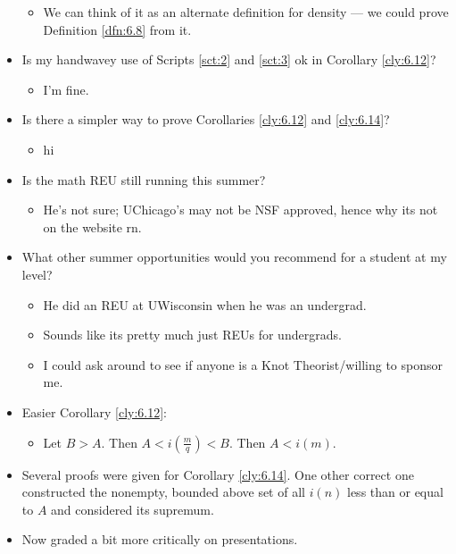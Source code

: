 \documentclass{report}
\begin{document}
\begin{itemize}
    \begin{itemize}
        \item We can think of it as an alternate definition for density --- we could prove Definition \ref{dfn:6.8} from it.
    \end{itemize}
    \item Is my handwavey use of Scripts \ref{sct:2} and \ref{sct:3} ok in Corollary \ref{cly:6.12}?
    \begin{itemize}
        \item I'm fine.
    \end{itemize}
    \item Is there a simpler way to prove Corollaries \ref{cly:6.12} and \ref{cly:6.14}?
    \begin{itemize}
        \item hi
    \end{itemize}
    \item Is the math REU still running this summer?
    \begin{itemize}
        \item He's not sure; UChicago's may not be NSF approved, hence why its not on the website rn.
    \end{itemize}
    \item What other summer opportunities would you recommend for a student at my level?
    \begin{itemize}
        \item He did an REU at UWisconsin when he was an undergrad.
        \item Sounds like its pretty much just REUs for undergrads.
        \item I could ask around to see if anyone is a Knot Theorist/willing to sponsor me.
    \end{itemize}
    \item {}Easier Corollary \ref{cly:6.12}:
    \begin{itemize}
        \item Let $B>A$. Then $A<i(\frac{m}{q})<B$. Then $A<i(m)$.
    \end{itemize}
    \item Several proofs were given for Corollary \ref{cly:6.14}. One other correct one constructed the nonempty, bounded above set of all $i(n)$ less than or equal to $A$ and considered its supremum.
    \item {}Now graded a bit more critically on presentations.
    \begin{itemize}

\end{itemize}
\end{itemize}
\end{document}
